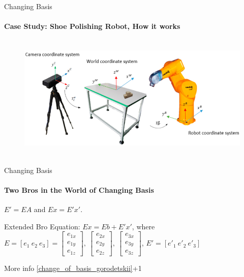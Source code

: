 \documentclass[aspectratio=169,notes]{beamer}
\begin{document}
\begin{frame}[t]{Changing Basis}
\framesubtitle{Case Study: Shoe Polishing Robot, How it works}
\vspace{-0.6cm}
    \begin{figure}[H]
        \centering\includegraphics[height=6cm,width=1\textwidth,keepaspectratio]{change_basis_practice_1.png}
        \label{fig:change_basis_practice_1.png}
    \end{figure}
\end{frame}

\begin{frame}[t]{Changing Basis}
\framesubtitle{Two Bros in the World of Changing Basis}
\LARGE \centering$E' = EA$ and $Ex=E'x'$.

Extended Bro Equation: $Ex = Eb + E'x'$, where $E = [e_1\ e_2\ e_3] = \begin{bmatrix}e_{1x}\\e_{1y} \\ e_{1z}\end{bmatrix},\ \begin{bmatrix}e_{2x}\\e_{2y} \\ e_{2z}\end{bmatrix},\ \begin{bmatrix}e_{3x}\\e_{3y} \\ e_{3z}\end{bmatrix}$, $E' = [e'_1\ e'_2\ e'_3]$ \smallskip

More info \autoref{change_of_basis_gorodetskii}+1
\end{frame}
\end{document}
